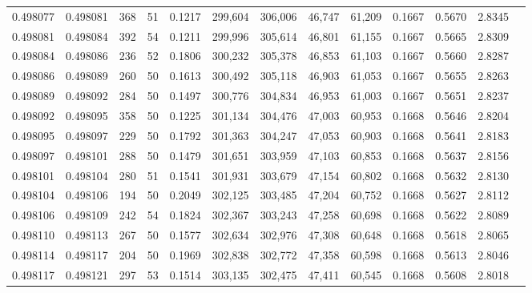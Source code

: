 \begin{tabular}{rrrrrrrrrrrrr}
0.498077 & 0.498081 & 368 &  51 &                                     0.1217 & 299,604 & 306,006 &  46,747 &  61,209 & 0.1667 & 0.5670 & 2.8345 \\
0.498081 & 0.498084 & 392 &  54 &                                     0.1211 & 299,996 & 305,614 &  46,801 &  61,155 & 0.1667 & 0.5665 & 2.8309 \\
0.498084 & 0.498086 & 236 &  52 &                                     0.1806 & 300,232 & 305,378 &  46,853 &  61,103 & 0.1667 & 0.5660 & 2.8287 \\
0.498086 & 0.498089 & 260 &  50 &                                     0.1613 & 300,492 & 305,118 &  46,903 &  61,053 & 0.1667 & 0.5655 & 2.8263 \\
0.498089 & 0.498092 & 284 &  50 &                                     0.1497 & 300,776 & 304,834 &  46,953 &  61,003 & 0.1667 & 0.5651 & 2.8237 \\
0.498092 & 0.498095 & 358 &  50 &                                     0.1225 & 301,134 & 304,476 &  47,003 &  60,953 & 0.1668 & 0.5646 & 2.8204 \\
0.498095 & 0.498097 & 229 &  50 &                                     0.1792 & 301,363 & 304,247 &  47,053 &  60,903 & 0.1668 & 0.5641 & 2.8183 \\
0.498097 & 0.498101 & 288 &  50 &                                     0.1479 & 301,651 & 303,959 &  47,103 &  60,853 & 0.1668 & 0.5637 & 2.8156 \\
0.498101 & 0.498104 & 280 &  51 &                                     0.1541 & 301,931 & 303,679 &  47,154 &  60,802 & 0.1668 & 0.5632 & 2.8130 \\
0.498104 & 0.498106 & 194 &  50 &                                     0.2049 & 302,125 & 303,485 &  47,204 &  60,752 & 0.1668 & 0.5627 & 2.8112 \\
0.498106 & 0.498109 & 242 &  54 &                                     0.1824 & 302,367 & 303,243 &  47,258 &  60,698 & 0.1668 & 0.5622 & 2.8089 \\
0.498110 & 0.498113 & 267 &  50 &                                     0.1577 & 302,634 & 302,976 &  47,308 &  60,648 & 0.1668 & 0.5618 & 2.8065 \\
0.498114 & 0.498117 & 204 &  50 &                                     0.1969 & 302,838 & 302,772 &  47,358 &  60,598 & 0.1668 & 0.5613 & 2.8046 \\
0.498117 & 0.498121 & 297 &  53 &                                     0.1514 & 303,135 & 302,475 &  47,411 &  60,545 & 0.1668 & 0.5608 & 2.8018 \\

\end{tabular}
